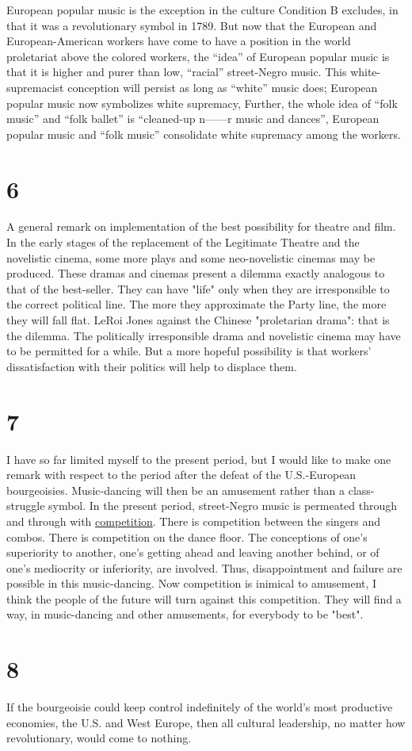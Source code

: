 European popular music is the exception in the culture Condition B excludes, in that it was a revolutionary symbol in 1789. But now that the European and European-American workers have come to have a position in the world proletariat above the colored workers, the \enquote{idea} of European popular music is that it is higher and purer than low, \enquote{racial} street-Negro music. This white-supremacist conception will persist as long as \enquote{white} music does; European popular music now symbolizes white supremacy, Further, the whole idea of \enquote{folk music} and \enquote{folk ballet} is \enquote{cleaned-up n------r music and dances}, European popular music and \enquote{folk music} consolidate white supremacy among the workers. 

\section*{6}
A general remark on implementation of the best possibility for theatre and film. In the early stages of the replacement of the Legitimate Theatre and the novelistic cinema, some more plays and some neo-novelistic cinemas may be produced. These dramas and cinemas present a dilemma exactly analogous to that of the best-seller. They can have "life" only when they are irresponsible to the correct political line. The more they approximate the Party line, the more they will fall flat. LeRoi Jones against the Chinese "proletarian drama": that is the dilemma. The politically irresponsible drama and novelistic cinema may have to be permitted for a while. But a more hopeful possibility is that workers' dissatisfaction with their politics will help to displace them. 

\section*{7}
I have so far limited myself to the present period, but I would like to make one remark with respect to the period after the defeat of the U.S.-European bourgeoisies. Music-dancing will then be an amusement rather than a class-struggle symbol. In the present period, street-Negro music is permeated through and through with \uline{competition}. There is competition between the singers and combos. There is competition on the dance floor. The conceptions of one's superiority to another, one's getting ahead and leaving another behind, or of one's mediocrity or inferiority, are involved. Thus, disappointment and failure are possible in this music-dancing. Now competition is inimical to amusement, I think the people of the future will turn against this competition. They will find a way, in music-dancing and other amusements, for everybody to be "best". 

\section*{{\Large 8}}
If the bourgeoisie could keep control indefinitely of the world's most productive economies, the U.S. and West Europe, then all cultural leadership, no matter how revolutionary, would come to nothing.
